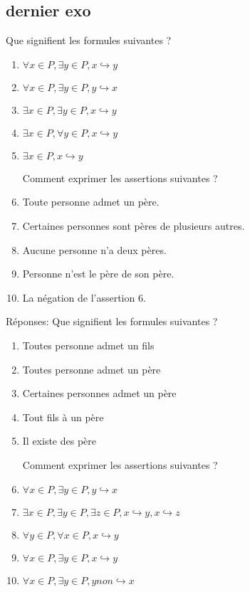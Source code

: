 \documentclass[french,titlepage] {article}
\begin{document}
\subsection{dernier exo}
\Large Que signifient les formules suivantes ?
\begin{enumerate}
\normalsize 
\item $\forall x \in P, \exists y \in P, x \hookrightarrow y$
\item $\forall x \in P, \exists y \in P, y \hookrightarrow x$
\item $\exists x \in P, \exists y \in P, x \hookrightarrow y$
\item $\exists x \in P, \forall y \in P, x \hookrightarrow y$
\item $\exists x \in P, x \hookrightarrow y$

\Large Comment exprimer les assertions suivantes ?
\normalsize 
\item Toute personne admet un père.
\item Certaines personnes sont pères de plusieurs autres.
\item Aucune personne n’a deux pères.
\item Personne n’est le père de son père.
\item La négation de l’assertion 6.
\end{enumerate}


Réponses:
\Large Que signifient les formules suivantes ?
\begin{enumerate}
\normalsize 
\item Toutes personne admet un fils 
\item Toutes personne admet un père 
\item Certaines personnes admet un père
\item Tout fils à un père
\item Il existe des père

\Large Comment exprimer les assertions suivantes ?
\normalsize 
\item $\forall x \in P, \exists y \in P, y \hookrightarrow x$
\item $\exists x \in P, \exists y \in P,\exists z \in P, x \hookrightarrow y,x \hookrightarrow z$
\item $\forall y \in P, \forall x \in P, x \hookrightarrow y$
\item $\forall x \in P, \exists y \in P, x \hookrightarrow y$
\item $\forall x \in P, \exists y \in P, y non \hookrightarrow x$

\end{enumerate}
\end{document}
